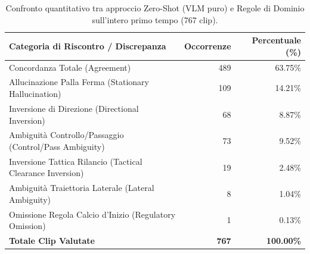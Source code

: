 \begin{table}[htbp]
\centering
\caption{Confronto quantitativo tra approccio Zero-Shot (VLM puro) e Regole di Dominio sull'intero primo tempo (767 clip).}
\label{tab:zero_shot_vs_domain_rules}
\begin{tabular}{lrr}
\hline
\textbf{Categoria di Riscontro / Discrepanza} & \textbf{Occorrenze} & \textbf{Percentuale (\%)} \\
\hline
Concordanza Totale (Agreement) & 489 & 63.75\% \\
Allucinazione Palla Ferma (Stationary Hallucination) & 109 & 14.21\% \\
Inversione di Direzione (Directional Inversion) & 68 & 8.87\% \\
Ambiguit\`a Controllo/Passaggio (Control/Pass Ambiguity) & 73 & 9.52\% \\
Inversione Tattica Rilancio (Tactical Clearance Inversion) & 19 & 2.48\% \\
Ambiguit\`a Traiettoria Laterale (Lateral Ambiguity) & 8 & 1.04\% \\
Omissione Regola Calcio d'Inizio (Regulatory Omission) & 1 & 0.13\% \\
\hline
\textbf{Totale Clip Valutate} & \textbf{767} & \textbf{100.00\%} \\
\hline
\end{tabular}
\end{table}